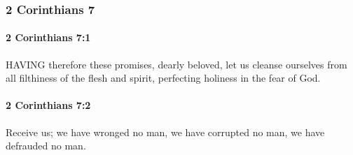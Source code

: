 	\subsubsection{2 Corinthians 7} %
		\label{2CORINTHIANS-7}
		
		\paragraph{2 Corinthians 7:1} %
			\label{2CORINTHIANS-7-1}

			HAVING therefore these promises, dearly beloved, let us cleanse ourselves from all filthiness of the flesh and spirit, perfecting holiness in the fear of God.

			\begin{framed}
			\scriptsize
				\begin{compactdesc}
					\item[SBLG] 
				\end{compactdesc}
			\end{framed}

		\paragraph{2 Corinthians 7:2} %
			\label{2CORINTHIANS-7-2}

			Receive us; we have wronged no man, we have corrupted no man, we have defrauded no man.

